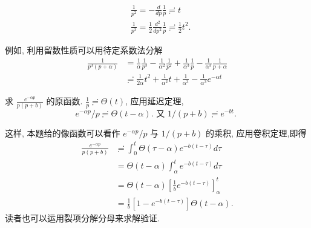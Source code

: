 $$    \begin{aligned}
    & \frac{1}{p^2}=-\frac{d}{d p} \frac{1}{p} \risingdotseq  t \\
    & \frac{1}{p^3}=\frac{1}{2} \frac{d^2}{d p^2} \frac{1}{p} \risingdotseq \frac{1}{2} t^2 .
    \end{aligned}$$


例如, 利用留数性质可以用待定系数法分解
$$
    \begin{aligned}
    \frac{1}{p^3(p+\alpha)} & =\frac{1}{\alpha} \frac{1}{p^3}-\frac{1}{\alpha^2} \frac{1}{p^2}+\frac{1}{\alpha^3} \frac{1}{p}-\frac{1}{\alpha^3} \frac{1}{p+\alpha} \\
    & \risingdotseq \frac{1}{2 \alpha} t^2+\frac{1}{\alpha^2} t+\frac{1}{\alpha^3}-\frac{1}{\alpha^3} e^{-\alpha t}
    \end{aligned}
$$

\begin{examplebox}{求 $\frac{e^{-\alpha p}}{p(p+b)}$ 的原函数.}
    $\frac{1}{p} \risingdotseq \Theta(t)$, 应用延迟定理,
    $$
e^{-\alpha p} / p \risingdotseq \Theta(t-\alpha) \text {. 又 } 1 /(p+b) \risingdotseq e^{-b t} \text {. }
$$

这样, 本题给的像函数可以看作 $e^{-\alpha p} / p$ 与 $1 /(p+b)$ 的乘积, 应用卷积定理,即得
$$
\begin{aligned}
\frac{e^{-\alpha p}}{p(p+b)} & \risingdotseq \int_0^t \Theta(\tau-\alpha) e^{-b(t-\tau)} d \tau \\
& =\Theta(t-\alpha) \int_\alpha^t e^{-b(t-\tau)} d \tau \\
& =\Theta(t-\alpha)\left[\frac{1}{b} e^{-b(t-\tau)}\right]_\alpha^t \\
& =\frac{1}{b}\left[1-e^{-b(t-\tau)}\right] \Theta(t-\alpha) .
\end{aligned}
$$
读者也可以运用裂项分解分母来求解验证.
\end{examplebox}

